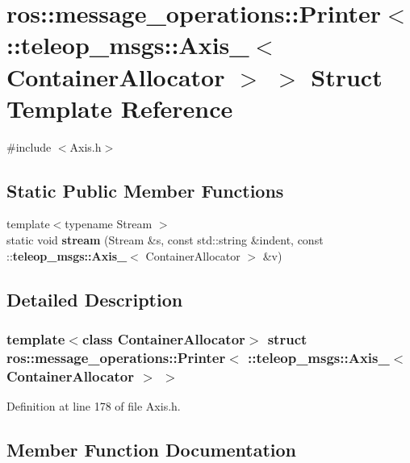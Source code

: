 \section{ros::message\_\-operations::Printer$<$ ::teleop\_\-msgs::Axis\_\-$<$ ContainerAllocator $>$ $>$ Struct Template Reference}
\label{structros_1_1message__operations_1_1Printer_3_01_1_1teleop__msgs_1_1Axis___3_01ContainerAllocator_01_4_01_4}


{\ttfamily \#include $<$Axis.h$>$}

\subsection*{Static Public Member Functions}
\begin{DoxyCompactItemize}
\item 
{\footnotesize template$<$typename Stream $>$ }\\static void {\bf stream} (Stream \&s, const std::string \&indent, const ::{\bf teleop\_\-msgs::Axis\_\-}$<$ ContainerAllocator $>$ \&v)
\end{DoxyCompactItemize}


\subsection{Detailed Description}
\subsubsection*{template$<$class ContainerAllocator$>$ struct ros::message\_\-operations::Printer$<$ ::teleop\_\-msgs::Axis\_\-$<$ ContainerAllocator $>$ $>$}



Definition at line 178 of file Axis.h.



\subsection{Member Function Documentation}
